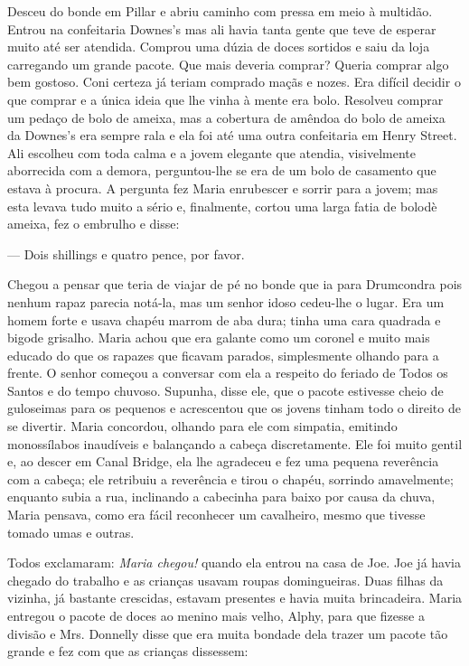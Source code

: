 Desceu do bonde em Pillar e abriu caminho com pressa em meio à
multidão. Entrou na confeitaria Downes's mas ali havia
tanta gente que teve de esperar muito até ser atendida. Comprou uma
dúzia de doces sortidos e saiu da loja carregando um grande pacote.
Que mais deveria comprar? Queria comprar algo bem gostoso. Coni
certeza já teriam comprado maçãs e nozes. Era difícil decidir o que
comprar e a única ideia que lhe vinha à mente era bolo. Resolveu
comprar um pedaço de bolo de ameixa, mas a cobertura de amêndoa do
bolo de ameixa da Downes's era sempre rala e ela foi até uma outra
confeitaria em Henry Street. Ali escolheu com toda calma e a jovem
elegante que atendia, visivelmente aborrecida com a demora,
perguntou-lhe se era de um bolo de casamento que estava à procura. A
pergunta fez Maria enrubescer e sorrir para a jovem; mas esta
levava tudo muito a sério e, finalmente, cortou uma larga fatia de
bolodè ameixa, fez o embrulho e disse:

--- Dois shillings e quatro pence, por favor.

Chegou a pensar que teria de viajar de pé no bonde que ia para
Drumcondra pois nenhum rapaz parecia notá-la, mas um senhor idoso
cedeu-lhe o lugar. Era um homem forte e usava chapéu marrom de aba
dura; tinha uma cara quadrada e bigode grisalho. Maria achou que era
galante como um coronel e muito mais educado do que os rapazes que
ficavam parados, simplesmente olhando para a frente. O senhor começou
a conversar com ela a respeito do feriado de Todos os Santos e do
tempo chuvoso. Supunha, disse ele, que o pacote estivesse cheio de
guloseimas para os pequenos e acrescentou que os jovens tinham todo o
direito de se divertir. Maria concordou, olhando para ele com
simpatia, emitindo monossílabos inaudíveis e balançando a cabeça
discretamente. Ele foi muito gentil e, ao descer em Canal Bridge, ela
lhe agradeceu e fez uma pequena reverência com a cabeça; ele retribuiu
a reverência e tirou o chapéu, sorrindo amavelmente; enquanto subia a
rua, inclinando a cabecinha para baixo por causa da chuva, Maria
pensava, como era fácil reconhecer um cavalheiro, mesmo que tivesse
tomado umas e outras.

Todos exclamaram: \textit{Maria chegou!} quando ela entrou na casa de Joe. Joe
já havia chegado do trabalho e as crianças usavam roupas domingueiras.
Duas filhas da vizinha, já bastante crescidas, estavam presentes e
havia muita brincadeira. Maria entregou
o pacote de doces ao menino mais velho, Alphy, para que fizesse
a divisão e Mrs. Donnelly disse que era muita bondade dela trazer
um pacote tão grande e fez com que as crianças dissessem:

